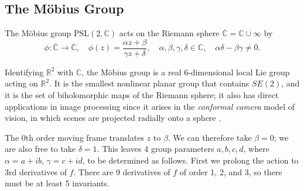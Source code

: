 \documentclass[review,onefignum,onetabnum]{siamonline190516}
\def\R{\mathbb{R}}
\begin{document}
\subsection{The M\"{o}bius Group}

The M\"obius group $\mathrm{PSL}(2,\mathbb{C})$ acts on the Riemann sphere
$\overline{\mathbb{C}} = \mathbb{C}\cup\infty$ by 
$$ \phi\colon \overline{\mathbb{C}} \to \overline{\mathbb{C}},\quad \phi(z) = \frac{\alpha z + \beta}{\gamma z + \delta},\quad \alpha,\beta,\gamma,\delta\in\mathbb{C}, \quad
\alpha\delta-\beta\gamma\ne 0.$$

Identifying $\R^2$ with $\mathbb{C}$, the M\"obius group is a real 6-dimensional local Lie group acting on $\mathbb{R}^2$.
It is the smallest nonlinear planar group that contains $SE(2)$, and it is the set of biholomorphic maps of the Riemann sphere; it also has direct applications in image processing since it arises in the {\em conformal camera} model of vision, in which scenes are projected radially onto a sphere \cite{lenz1990group,turski2004geometric}. 

The 0th order moving frame translates $z$ to $\beta$. We can therefore take $\beta=0$; we are also free to take $\delta=1$. This leaves 4 group parameters $a,b,c,d$, where $\alpha = a + i b$, $\gamma = c + i d$, to be determined as follows. First we prolong the action to 3rd derivatives of $f$. There are 9 derivatives of $f$ of order 1, 2, and 3, so there must be at least 5 invariants.
\end{document}
